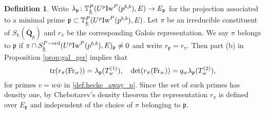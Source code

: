 \documentclass[leqno]{amsart}
\theoremstyle{definition}
\newtheorem{defn}[thm]{Definition}
\theoremstyle{remark}
\newcommand{\Q}{{\mathbf{Q}}}
\DeclareMathOperator{\mtr}{tr}
\newcommand{\Fr}{\textnormal{Fr}} %
\newcommand{\fp}{\mathfrak{p}}
\newcommand{\bw}{\overline{w}}
\newcommand{\wt}[1]{\underline{ #1 }}
\newcommand{\Iw}{\textnormal{Iw}} %
\newcommand{\TT}{\mathbb{T}} %
\newcommand{\ord}{\textnormal{ord}} %
\begin{document}
\begin{defn}\label{def:rep_prime}
	Write 
	$\lambda_\fp\colon \TT^P_{\wt{k}}(U^p\Iw^P(p^{b,b}),E)\to E_\fp$
    for the projection associated 
    to a minimal prime $\fp\subset \TT^P_{\wt{k}}(U^p\Iw^P(p^{b,b}),E)$.
    Let $\pi$ be an irreducible constituent 
    of $S_{\wt{k}}(\bar{\Q}_p)$
    and $r_\pi$ be the corresponding Galois representation.
    We say $\pi$ belongs to $\fp$ if
	$\pi\cap S_{\wt{k}}^{P-\ord}(U^p\Iw^P(p^{b,b}),E)_{\fp}\neq 0$
    and write $r_\fp=r_\pi$.
    Then part (b) in Proposition \ref{prop:gal_ger} implies that
	\begin{equation}\label{eq:Gal_hecke_away_p}
		\mtr(r_\pi(\Fr_w))=\lambda_\fp(T_w^{(1)}),\quad
		\det(r_\pi(\Fr_w))=q_w\lambda_\fp(T_w^{(2)}),\,
	\end{equation}
	for primes $v=w\bw$ in \eqref{def:hecke_away_p}.
    Since the set of such primes has density one,
	by Chebotarev's density theorem
	the representation $r_\pi$ is defined over $E_{\fp}$
	and independent of the choice of $\pi$ belonging to $\fp$.
\end{defn}
\end{document}
